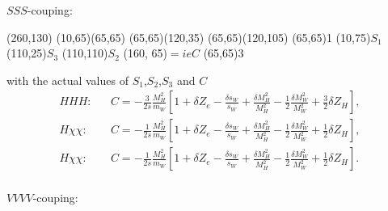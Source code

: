 $SSS$-couping:

\begin{axopicture}(260,130) %
	\Line[dash](10,65)(65,65)
	\Line[dash](65,65)(120,35)
	\Line[dash](65,65)(120,105)
	\Vertex(65,65){1}		
	\Text(10,75){$S_1$}
	\Text(110,25){$S_3$}
	\Text(110,110){$S_2$}
	\Text(160, 65){$=ieC$}
	\Vertex(65,65){3}
\end{axopicture}
\newline with the actual values of $S_1$,$S_2$,$S_3$ and $C$
\begin{eqnarray}
HHH:&&C=-\frac{3}{2s}\frac{M^2_H}{m_W}\left[ 1+\delta Z_e-\frac{\delta s_W}{s_W}+\frac{\delta M^2_H}{M^2_H}-\frac{1}{2}\frac{\delta M^2_W}{M^2_W}+\frac{3}{2}\delta Z_H \right],\nonumber\\
H\chi\chi:&&C=-\frac{1}{2s}\frac{M^2_H}{m_W}\left[ 1+\delta Z_e-\frac{\delta s_W}{s_W}+\frac{\delta M^2_H}{M^2_H}-\frac{1}{2}\frac{\delta M^2_W}{M^2_W}+\frac{1}{2}\delta Z_H \right],\nonumber\\
H\chi\chi:&&C=-\frac{1}{2s}\frac{M^2_H}{m_W}\left[ 1+\delta Z_e-\frac{\delta s_W}{s_W}+\frac{\delta M^2_H}{M^2_H}-\frac{1}{2}\frac{\delta M^2_W}{M^2_W}+\frac{1}{2}\delta Z_H \right].\nonumber\\
\end{eqnarray}


$VVVV$-couping:

